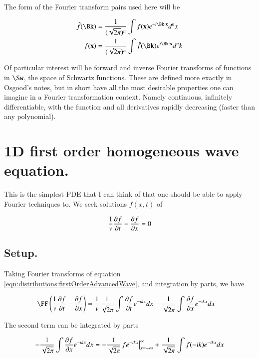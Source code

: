 The form of the Fourier transform pairs used here will be

\begin{align*}
\hat{f}(\Bk) &= \frac{1}{(\sqrt{2\pi})^n} \int f(\Bx) e^{-i \Bk \cdot \Bx } d^n x \\
{f}(\Bx) &= \frac{1}{(\sqrt{2\pi})^n} \int \hat{f}(\Bk) e^{i \Bk \cdot \Bx } d^n k \\
\end{align*}

Of particular interest will be forward and inverse Fourier transforms
of functions in $\Sw$, the space of Schwartz functions.  These are defined
more exactly in Osgood's notes, but in short have all the most desirable
properties one can imagine in a Fourier transformation context.  Namely
continuous, infinitely differentiable, with the function and all 
derivatives rapidly decreasing (faster than any polynomial).

\section{1D first order homogeneous wave equation. }

This is the simplest PDE that I can think of that one should be able 
to apply Fourier techniques to.  We seek solutions $f(x,t)$ of

\begin{align}\label{eqn:distributions:firstOrderAdvancedWave}
\inv{v} \PD{t}{f} - \PD{x}{f} = 0
\end{align}

\subsection{Setup. }

Taking Fourier transforms of equation \ref{eqn:distributions:firstOrderAdvancedWave}, and integration
by parts, we have

\begin{align*}
\FF\left(\inv{v} \PD{t}{f} - \PD{x}{f} \right) &=
\inv{v} \inv{\sqrt{2\pi}} \int \PD{t}{f} e^{-i k x} dx - \inv{\sqrt{2\pi}} \int \PD{x}{f} e^{-i k x } dx
\end{align*}

The second term can be integrated by parts

\begin{align*}
- \inv{\sqrt{2\pi}} \int \PD{x}{f} e^{-i k x } dx
=
- \inv{\sqrt{2\pi}} {\left. {f} e^{-i k x } \right\vert}_{x = -\infty}^{\infty}
+ \inv{\sqrt{2\pi}} \int {f} (-i k ) e^{-i k x } dx
\end{align*}

